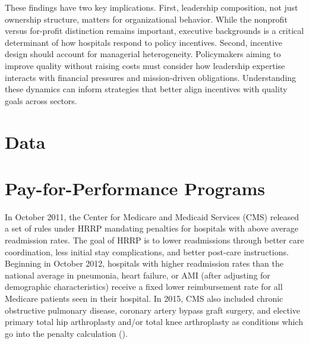 \documentclass[12pt]{article}
\theoremstyle{definition}   %
\begin{document}
    These findings have two key implications. First, leadership composition, not just ownership structure, matters for organizational behavior. While the nonprofit versus for-profit distinction remains important, executive backgrounds is a critical determinant of how hospitals respond to policy incentives. Second, incentive design should account for managerial heterogeneity. Policymakers aiming to improve quality without raising costs must consider how leadership expertise interacts with financial pressures and mission-driven obligations. Understanding these dynamics can inform strategies that better align incentives with quality goals across sectors.


    

	
	\newpage

    \singlespacing

    \printbibliography

    \onehalfspacing

\appendix
\setcounter{table}{0}
\renewcommand{\thetable}{A.\arabic{table}}
\renewcommand{\thefigure}{A.\arabic{figure}}

\newpage

\section{Data}\label{appendixdata}







\section{Pay-for-Performance Programs}\label{app:programs}

In October 2011, the Center for Medicare and Medicaid Services (CMS) released a set of rules under HRRP mandating penalties for hospitals with above average readmission rates. The goal of HRRP is to lower readmissions through better care coordination, less initial stay complications, and better post-care instructions. Beginning in October 2012, hospitals with higher readmission rates than the national average in pneumonia, heart failure, or AMI (after adjusting for demographic characteristics) receive a fixed lower reimbursement rate for all Medicare patients seen in their hospital. In 2015, CMS also included chronic obstructive pulmonary disease, coronary artery bypass graft surgery, and elective primary total hip arthroplasty and/or total knee arthroplasty as conditions which go into the penalty calculation (\cite{CMS}). 
    
\end{document}
